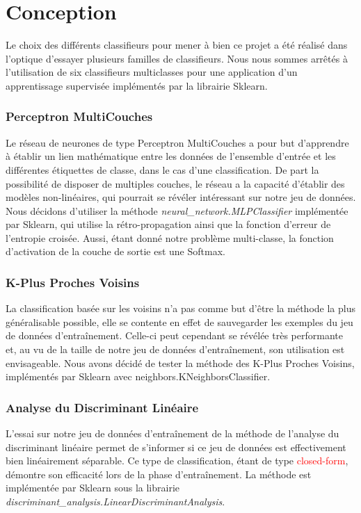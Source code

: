 \section{Conception}
Le choix des différents classifieurs pour mener à bien ce projet a été réalisé dans l'optique d'essayer plusieurs familles de classifieurs. Nous nous sommes arrêtés à l'utilisation de six classifieurs multiclasses pour une application d'un apprentissage supervisée implémentés par la librairie Sklearn.

\subsubsection*{Perceptron MultiCouches}
Le réseau de neurones de type Perceptron MultiCouches a pour but d'apprendre à établir un lien mathématique entre les données de l'ensemble d'entrée et les différentes étiquettes de classe, dans le cas d'une classification. De part la possibilité de disposer de multiples couches, le réseau a la capacité d'établir des modèles non-linéaires, qui pourrait se révéler intéressant sur notre jeu de données. Nous décidons d'utiliser la méthode \emph{neural\_network.MLPClassifier} implémentée par Sklearn, qui utilise la rétro-propagation ainsi que la fonction d'erreur de l'entropie croisée. Aussi, étant donné notre problème multi-classe, la fonction d'activation de la couche de sortie est une Softmax.

\subsubsection*{K-Plus Proches Voisins}
La classification basée sur les voisins n'a pas comme but d'être la méthode la plus généralisable possible, elle se contente en effet de sauvegarder les exemples du jeu de données d'entraînement. Celle-ci peut cependant se révélée très performante et, au vu de la taille de notre jeu de données d'entraînement, son utilisation est envisageable.
Nous avons décidé de tester la méthode des K-Plus Proches Voisins, implémentés par Sklearn avec neighbors.KNeighborsClassifier.

\subsubsection*{Analyse du Discriminant Linéaire}
L'essai sur notre jeu de données d'entraînement de la méthode de l'analyse du discriminant linéaire permet de s'informer si ce jeu de données est effectivement bien linéairement séparable. Ce type de classification, étant de type \textcolor{red}{closed-form}, démontre son efficacité lors de la phase d'entraînement. La méthode est implémentée par Sklearn sous la librairie \emph{discriminant\_analysis.LinearDiscriminantAnalysis}.

